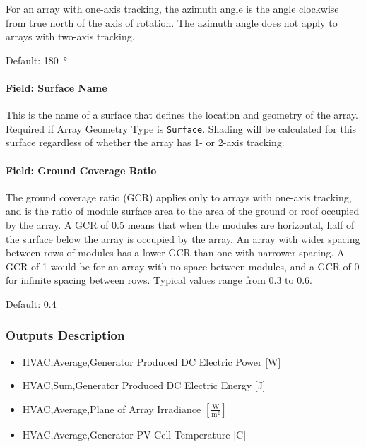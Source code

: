 For an array with one-axis tracking, the azimuth angle is the angle
clockwise from true north of the axis of rotation. The azimuth angle
does not apply to arrays with two-axis tracking.

Default: \SI{180}{\degree}

\paragraph{Field: Surface Name}\label{generatorpvwatts-field-surface-name}

This is the name of a surface that defines the location and geometry of
the array. Required if Array Geometry Type is \texttt{Surface}. Shading
will be calculated for this surface regardless of whether the array has
1- or 2-axis tracking.

\paragraph{Field: Ground Coverage
Ratio}\label{field-ground-coverage-ratio}

The ground coverage ratio (GCR) applies only to arrays with one-axis
tracking, and is the ratio of module surface area to the area of the
ground or roof occupied by the array. A GCR of 0.5 means that when the
modules are horizontal, half of the surface below the array is occupied
by the array. An array with wider spacing between rows of modules has a
lower GCR than one with narrower spacing. A GCR of 1 would be for an
array with no space between modules, and a GCR of 0 for infinite spacing
between rows. Typical values range from 0.3 to 0.6.

Default: 0.4

\subsubsection{Outputs Description}\label{outputs-description}

\begin{itemize}
\item
  HVAC,Average,Generator Produced DC Electric Power {[}W{]}
\item
  HVAC,Sum,Generator Produced DC Electric Energy {[}J{]}
\item
  HVAC,Average,Plane of Array Irradiance $\left [\frac{\text{W}}{\text{m}^2} \right ]$
\item
  HVAC,Average,Generator PV Cell Temperature {[}C{]}
\end{itemize}


